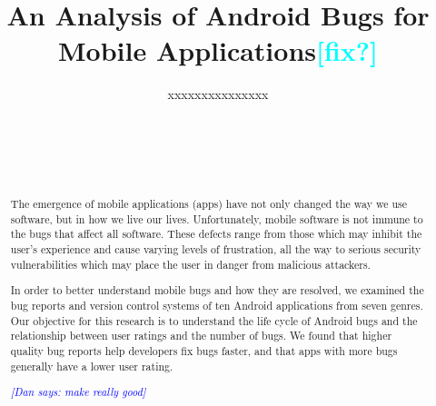 \documentclass{sig-alternate}
\newcommand{\todo}[1]{\textcolor{cyan}{\textbf{[#1]}}}
\newcommand{\dan}[1]{\textcolor{blue}{{\it [Dan says: #1]}}}
\newif\ifisnopii
\begin{document}


\title{An Analysis of Android Bugs for Mobile Applications\todo{fix?}}

\ifisnopii %
\author{
%
\alignauthor
Daniel~E.~Krutz, Pooja Apparao Raghoji,    Gorde, Shreya, Waleed Zogaan, Mujhid, Ibrahim, \& Ziyi Bai \\
	\affaddr{Software Engineering Department}\\
       \affaddr{Rochester Institute of Technology}\\
       \affaddr{1 Lomb Memorial Drive}\\
       \affaddr{Rochester, NY, USA} \\
       \email{\{dxkvse, pa5878, skg1689, waz7355, ijm9654, zb6470\}@rit.edu}
       \alignauthor
} %

\else %
\author{
%
\alignauthor
xxxxxxxxxxxxxxx\\ 	
	\\
       \\
       \\
        \\
       \alignauthor
} %
\fi %


\maketitle

\begin{abstract}
The emergence of mobile applications (apps) have not only changed the way we use software, but in how we live our lives. Unfortunately, mobile software is not immune to the bugs that affect all software. These defects range from those which may inhibit the user's experience and cause varying levels of frustration, all the way to serious security vulnerabilities which may place the user in danger from malicious attackers. 

In order to better understand mobile bugs and how they are resolved, we examined the bug reports and version control systems of ten Android applications from seven genres. Our objective for this research is to understand the life cycle of Android bugs and the relationship between user ratings and the number of bugs. We found that higher quality bug reports help developers fix bugs faster, and that apps with more bugs generally have a lower user rating.

\dan{make really good}

\end{abstract}
\end{document}
